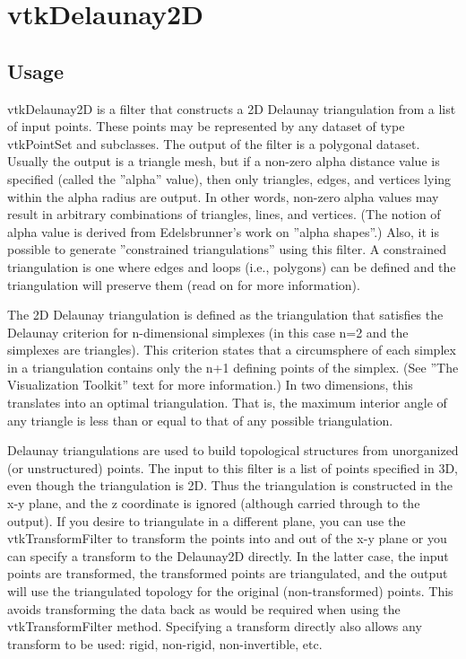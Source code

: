 \section{vtkDelaunay2D}

\subsection{Usage}

 vtkDelaunay2D is a filter that constructs a 2D Delaunay triangulation from
 a list of input points. These points may be represented by any dataset of
 type vtkPointSet and subclasses. The output of the filter is a polygonal
 dataset. Usually the output is a triangle mesh, but if a non-zero alpha
 distance value is specified (called the ''alpha'' value), then only
 triangles, edges, and vertices lying within the alpha radius are
 output. In other words, non-zero alpha values may result in arbitrary
 combinations of triangles, lines, and vertices. (The notion of alpha value
 is derived from Edelsbrunner's work on ''alpha shapes''.) Also, it is
 possible to generate ''constrained triangulations'' using this filter.
 A constrained triangulation is one where edges and loops (i.e., polygons)
 can be defined and the triangulation will preserve them (read on for 
 more information).

 The 2D Delaunay triangulation is defined as the triangulation that 
 satisfies the Delaunay criterion for n-dimensional simplexes (in this case
 n=2 and the simplexes are triangles). This criterion states that a 
 circumsphere of each simplex in a triangulation contains only the n+1 
 defining points of the simplex. (See ''The Visualization Toolkit'' text 
 for more information.) In two dimensions, this translates into an optimal 
 triangulation. That is, the maximum interior angle of any triangle is less 
 than or equal to that of any possible triangulation.
 
 Delaunay triangulations are used to build topological structures
 from unorganized (or unstructured) points. The input to this filter
 is a list of points specified in 3D, even though the triangulation
 is 2D. Thus the triangulation is constructed in the x-y plane, and
 the z coordinate is ignored (although carried through to the
 output). If you desire to triangulate in a different plane, you
 can use the vtkTransformFilter to transform the points into and
 out of the x-y plane or you can specify a transform to the Delaunay2D
 directly.  In the latter case, the input points are transformed, the
 transformed points are triangulated, and the output will use the
 triangulated topology for the original (non-transformed) points.  This
 avoids transforming the data back as would be required when using the
 vtkTransformFilter method.  Specifying a transform directly also allows
 any transform to be used: rigid, non-rigid, non-invertible, etc.

